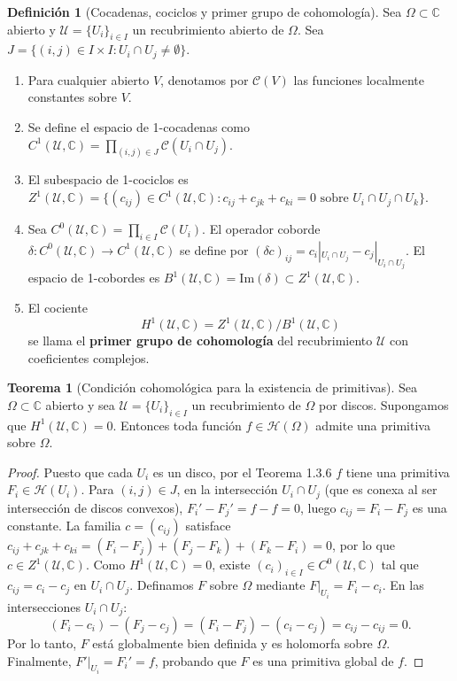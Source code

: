 \documentclass[11pt,a4paper]{article}
\theoremstyle{definition}
\newtheorem{definicion}{Definición}[section]
\newtheorem{teorema}{Teorema}[section]
\theoremstyle{remark}
\numberwithin{equation}{section}
\begin{document}
\begin{definicion}[Cocadenas, cociclos y primer grupo de cohomología]
Sea $\Omega \subset \mathbb{C}$ abierto y $\mathcal{U} = \{U_i\}_{i \in I}$ un recubrimiento abierto de $\Omega$. Sea $J = \{(i,j) \in I \times I : U_i \cap U_j \neq \emptyset\}$.
\begin{enumerate}
\item Para cualquier abierto $V$, denotamos por $\mathcal{C}(V)$ las funciones localmente constantes sobre $V$.
\item Se define el espacio de 1-cocadenas como $C^1(\mathcal{U}, \mathbb{C}) = \prod_{(i,j) \in J} \mathcal{C}(U_i \cap U_j)$.
\item El subespacio de 1-cociclos es $Z^1(\mathcal{U}, \mathbb{C}) = \{(c_{ij}) \in C^1(\mathcal{U}, \mathbb{C}) : c_{ij} + c_{jk} + c_{ki} = 0 \text{ sobre } U_i \cap U_j \cap U_k\}$.
\item Sea $C^0(\mathcal{U}, \mathbb{C}) = \prod_{i \in I} \mathcal{C}(U_i)$. El operador coborde $\delta: C^0(\mathcal{U}, \mathbb{C}) \to C^1(\mathcal{U}, \mathbb{C})$ se define por $(\delta c)_{ij} = c_i|_{U_i \cap U_j} - c_j|_{U_i \cap U_j}$. El espacio de 1-cobordes es $B^1(\mathcal{U}, \mathbb{C}) = \mathrm{Im}(\delta) \subset Z^1(\mathcal{U}, \mathbb{C})$.
\item El cociente
\begin{equation}
H^1(\mathcal{U}, \mathbb{C}) = Z^1(\mathcal{U}, \mathbb{C}) / B^1(\mathcal{U}, \mathbb{C})
\end{equation}
se llama el \textbf{primer grupo de cohomología} del recubrimiento $\mathcal{U}$ con coeficientes complejos.
\end{enumerate}
\end{definicion}

\begin{teorema}[Condición cohomológica para la existencia de primitivas]
Sea $\Omega \subset \mathbb{C}$ abierto y sea $\mathcal{U} = \{U_i\}_{i \in I}$ un recubrimiento de $\Omega$ por discos. Supongamos que $H^1(\mathcal{U}, \mathbb{C}) = 0$. Entonces toda función $f \in \mathcal{H}(\Omega)$ admite una primitiva sobre $\Omega$.
\end{teorema}
\begin{proof}
Puesto que cada $U_i$ es un disco, por el Teorema 1.3.6 $f$ tiene una primitiva $F_i \in \mathcal{H}(U_i)$. Para $(i,j) \in J$, en la intersección $U_i \cap U_j$ (que es conexa al ser intersección de discos convexos), $F_i' - F_j' = f - f = 0$, luego $c_{ij} = F_i - F_j$ es una constante. 
La familia $c = (c_{ij})$ satisface $c_{ij} + c_{jk} + c_{ki} = (F_i - F_j) + (F_j - F_k) + (F_k - F_i) = 0$, por lo que $c \in Z^1(\mathcal{U}, \mathbb{C})$.
Como $H^1(\mathcal{U}, \mathbb{C}) = 0$, existe $(c_i)_{i \in I} \in C^0(\mathcal{U}, \mathbb{C})$ tal que $c_{ij} = c_i - c_j$ en $U_i \cap U_j$.
Definamos $F$ sobre $\Omega$ mediante $F|_{U_i} = F_i - c_i$. En las intersecciones $U_i \cap U_j$:
\[
(F_i - c_i) - (F_j - c_j) = (F_i - F_j) - (c_i - c_j) = c_{ij} - c_{ij} = 0.
\]
Por lo tanto, $F$ está globalmente bien definida y es holomorfa sobre $\Omega$. Finalmente, $F'|_{U_i} = F_i' = f$, probando que $F$ es una primitiva global de $f$.
\end{proof}
\end{document}
